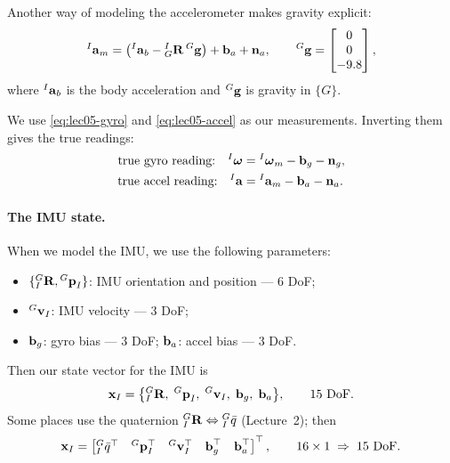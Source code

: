 \noindent Another way of modeling the accelerometer makes gravity explicit:
\begin{align}
{}^{I}\boldsymbol{\mathbf{a}}_{m} = \big({}^{I}\boldsymbol{\mathbf{a}}_b - {}^{I}_{G}\boldsymbol{\mathbf{R}}\,{}^{G}\boldsymbol{\mathbf{g}}\big) + \boldsymbol{\mathbf{b}}_a + \boldsymbol{\mathbf{n}}_a,
\qquad
{}^{G}\boldsymbol{\mathbf{g}} = \begin{bmatrix} 0 \\ 0 \\ -9.8 \end{bmatrix},
\end{align}
where ${}^{I}\boldsymbol{\mathbf{a}}_b$ is the body acceleration and ${}^{G}\boldsymbol{\mathbf{g}}$ is gravity in $\{G\}$.

We use \eqref{eq:lec05-gyro} and \eqref{eq:lec05-accel} as our measurements. Inverting them gives the true readings:
\begin{align}
\text{true gyro reading:} \quad {}^{I}\boldsymbol{\mathbf{\omega}} &= {}^{I}\boldsymbol{\mathbf{\omega}}_{m} - \boldsymbol{\mathbf{b}}_g - \boldsymbol{\mathbf{n}}_g, \\
\text{true accel reading:} \quad {}^{I}\boldsymbol{\mathbf{a}} &= {}^{I}\boldsymbol{\mathbf{a}}_{m} - \boldsymbol{\mathbf{b}}_a - \boldsymbol{\mathbf{n}}_a.
\end{align}

\paragraph{The IMU state.} When we model the IMU, we use the following parameters:
\begin{itemize}[noitemsep,topsep=2pt]
\item $\{{}^{G}_{I}\boldsymbol{\mathbf{R}}, {}^{G}\boldsymbol{\mathbf{p}}_I\}$: IMU orientation and position --- 6 DoF;
\item ${}^{G}\boldsymbol{\mathbf{v}}_I$: IMU velocity --- 3 DoF;
\item $\boldsymbol{\mathbf{b}}_g$: gyro bias --- 3 DoF; \quad $\boldsymbol{\mathbf{b}}_a$: accel bias --- 3 DoF.
\end{itemize}
Then our state vector for the IMU is
\begin{align}
\boldsymbol{\mathbf{x}}_I = \big\{ {}^{G}_{I}\boldsymbol{\mathbf{R}},\; {}^{G}\boldsymbol{\mathbf{p}}_I,\; {}^{G}\boldsymbol{\mathbf{v}}_I,\; \boldsymbol{\mathbf{b}}_g,\; \boldsymbol{\mathbf{b}}_a \big\}, \qquad \text{15 DoF}.
\end{align}
Some places use the quaternion ${}^{G}_{I}\boldsymbol{\mathbf{R}} \Leftrightarrow {}^{G}_{I}\bar{q}$ (Lecture~2); then
\begin{align}
\boldsymbol{\mathbf{x}}_I = \begin{bmatrix} {}^{G}_{I}\bar{q}^\top & {}^{G}\boldsymbol{\mathbf{p}}_I^\top & {}^{G}\boldsymbol{\mathbf{v}}_I^\top & \boldsymbol{\mathbf{b}}_g^\top & \boldsymbol{\mathbf{b}}_a^\top \end{bmatrix}^\top, \qquad 16\times1 \;\Rightarrow\; \text{15 DoF}.
\end{align}

